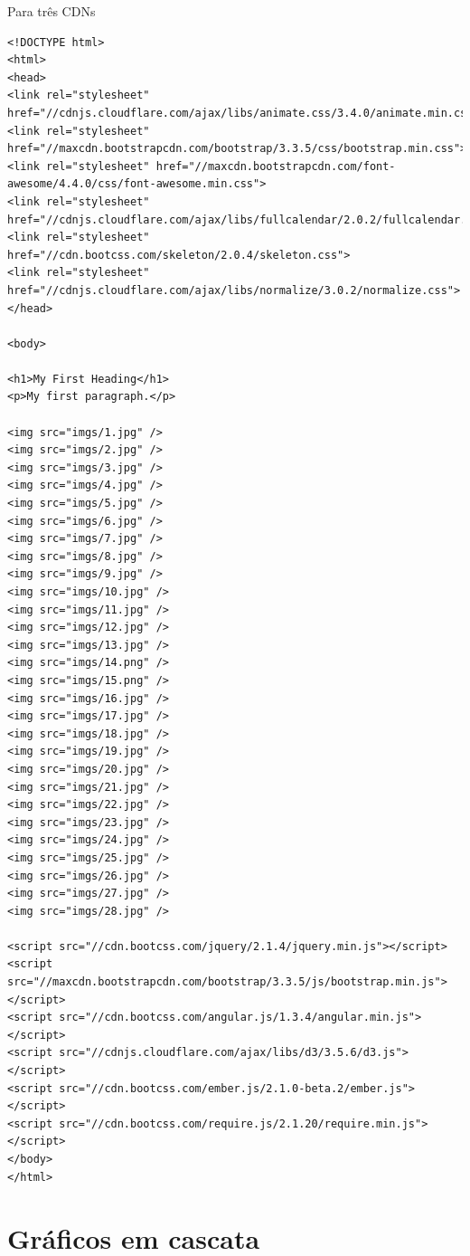 \begin{apendicesenv}
Para três CDNs
\begin{lstlisting}
<!DOCTYPE html>
<html>
<head>
<link rel="stylesheet" href="//cdnjs.cloudflare.com/ajax/libs/animate.css/3.4.0/animate.min.css">
<link rel="stylesheet" href="//maxcdn.bootstrapcdn.com/bootstrap/3.3.5/css/bootstrap.min.css">
<link rel="stylesheet" href="//maxcdn.bootstrapcdn.com/font-awesome/4.4.0/css/font-awesome.min.css">	
<link rel="stylesheet" href="//cdnjs.cloudflare.com/ajax/libs/fullcalendar/2.0.2/fullcalendar.js">
<link rel="stylesheet" href="//cdn.bootcss.com/skeleton/2.0.4/skeleton.css">
<link rel="stylesheet" href="//cdnjs.cloudflare.com/ajax/libs/normalize/3.0.2/normalize.css">
</head>

<body>

<h1>My First Heading</h1>
<p>My first paragraph.</p>
	
<img src="imgs/1.jpg" />
<img src="imgs/2.jpg" />
<img src="imgs/3.jpg" />
<img src="imgs/4.jpg" />
<img src="imgs/5.jpg" />
<img src="imgs/6.jpg" />
<img src="imgs/7.jpg" />
<img src="imgs/8.jpg" />
<img src="imgs/9.jpg" />
<img src="imgs/10.jpg" />
<img src="imgs/11.jpg" />
<img src="imgs/12.jpg" />
<img src="imgs/13.jpg" />
<img src="imgs/14.png" />
<img src="imgs/15.png" />
<img src="imgs/16.jpg" />
<img src="imgs/17.jpg" />
<img src="imgs/18.jpg" />
<img src="imgs/19.jpg" />
<img src="imgs/20.jpg" />
<img src="imgs/21.jpg" />
<img src="imgs/22.jpg" />
<img src="imgs/23.jpg" />
<img src="imgs/24.jpg" />
<img src="imgs/25.jpg" />
<img src="imgs/26.jpg" />
<img src="imgs/27.jpg" />
<img src="imgs/28.jpg" />

<script src="//cdn.bootcss.com/jquery/2.1.4/jquery.min.js"></script>
<script src="//maxcdn.bootstrapcdn.com/bootstrap/3.3.5/js/bootstrap.min.js"></script>
<script src="//cdn.bootcss.com/angular.js/1.3.4/angular.min.js"></script>
<script src="//cdnjs.cloudflare.com/ajax/libs/d3/3.5.6/d3.js"></script>
<script src="//cdn.bootcss.com/ember.js/2.1.0-beta.2/ember.js"></script>
<script src="//cdn.bootcss.com/require.js/2.1.20/require.min.js"></script>	
</body>
</html>

\end{lstlisting}

\end{apendicesenv}

\chapter{Gráficos em cascata}
\label{apend:graficosemcascata}

